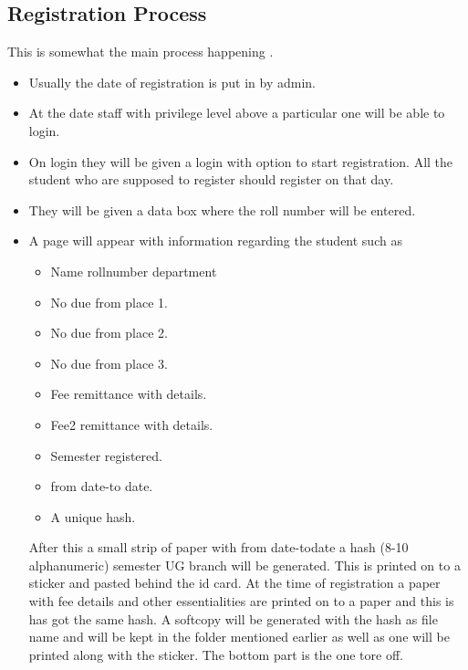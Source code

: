 \documentclass[a4paper,twoside]{article}
\begin{document}
\subsection{Registration Process}
 This is somewhat the main process happening . 
 \begin{itemize}
 \item Usually the date of registration is put in by admin. 
 \item At the date staff with privilege level above a particular one will be able to login.
 \item On login they will be given a login with option to start registration. All the student who are supposed to register should register on that day.
 \item They will be given a data box where the roll number will be entered. 
 \item A page will appear with information regarding the student such as 
 \begin{itemize}
 \item Name rollnumber department  
\item  No due from place 1.
 \item No due from place 2.
 \item No due from place 3.
 \item Fee remittance with details.
 \item Fee2 remittance with details.
 \item Semester registered. 
 \item from date-to date.
\item A unique hash. 
 \end{itemize}
 After this a small strip of paper with from date-todate a hash (8-10 alphanumeric) semester UG branch will be generated. This is printed on to a sticker and pasted behind the id card. At the time of registration a paper with fee details and other essentialities are printed on to a paper and this is has got the same hash. A softcopy will be generated with the hash as file name  and will be kept in the folder mentioned earlier as well as one will be printed along with the sticker. The bottom part is the one tore off. 
 \end{itemize}
\end{document}
